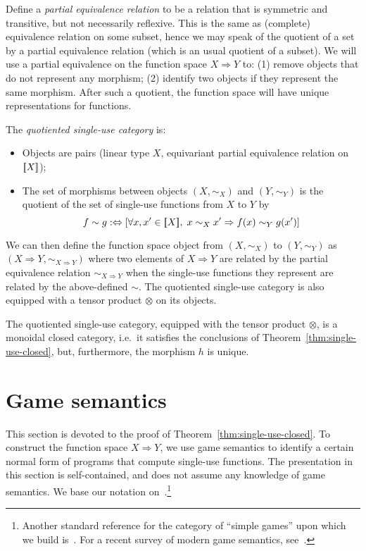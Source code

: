 \documentclass[a4paper,UKenglish,cleveref, autoref, numberwithinsect, thm-restate]{lipics-v2021}
\begin{document}
Define a \emph{partial equivalence relation} to be a relation that is symmetric and transitive, but not necessarily reflexive.  This is the same as (complete) equivalence relation on some subset, hence we may speak of the quotient of a set by a partial equivalence relation (which is an usual quotient of a subset). We will use a partial equivalence on the function space $X \Rightarrow Y$ to: (1)
 remove objects that do not represent any morphism; (2) identify two objects if they represent the same morphism. After such a quotient, the function space will have unique representations for functions. 

\begin{definition}
    The \emph{quotiented single-use category} is: 
    \begin{itemize}
    \item Objects are pairs (linear type $X$, equivariant partial equivalence relation on $[{\kern-0.45ex}[X]{\kern-0.45ex}]$);
    \item The set of morphisms between objects $(X,\sim_X)$ and $(Y,\sim_Y)$ is the quotient of the set of single-use functions from $X$ to $Y$ by
    \[ f \sim g :\Leftrightarrow \left[ \forall x,x' \in [{\kern-0.45ex}[X]{\kern-0.45ex}], \; x \sim_X x' \Rightarrow f(x) \sim_Y g(x') \right] \]
    \end{itemize}
\end{definition}
We can then define the function space object from $(X,\sim_X)$ to $(Y,\sim_Y)$ as $(X\Rightarrow Y, \sim_{X\Rightarrow Y})$ where two elements of $X\Rightarrow Y$ are related by the partial equivalence relation $\sim_{X\Rightarrow Y}$ when the single-use functions they represent are related by the above-defined $\sim$. The quotiented single-use category is also equipped with a tensor product $\otimes$ on its objects.
\begin{theorem}\label{thm:quotient-closed}
    The quotiented single-use category, equipped with the tensor product $\otimes$, is a monoidal closed category, i.e.~it satisfies the conclusions of Theorem~\ref{thm:single-use-closed}, but, furthermore, the morphism $h$ is unique.
\end{theorem}

\newcommand{\invar}[1]{#1_{\mathrm{in}}}
\newcommand{\outvar}[1]{#1_{\mathrm{out}}}

\section{Game semantics}
\label{sec:game-semantics}

This section is devoted to the proof of Theorem~\ref{thm:single-use-closed}. To construct the function space $X \Rightarrow Y$, we use game semantics to identify a certain normal form of programs that compute single-use functions. The presentation in this section is self-contained, and does not assume any knowledge of game semantics. We base our notation on~\cite{abramsky2013semantics}.\footnote{Another standard reference for the category of ``simple games'' upon which we build is~\cite{Hyland1997}. For a recent survey of modern game semantics, see~\cite{ClairambaultHDR}.}
\end{document}
